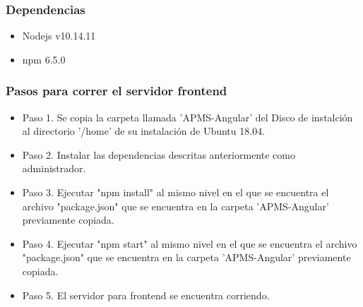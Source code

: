 \subsubsection{Dependencias}

\begin{itemize}
    \item Nodejs v10.14.11
    \item npm 6.5.0
\end{itemize}

\subsubsection{Pasos para correr el servidor frontend}

\begin{itemize}
    \item Paso 1. Se copia la carpeta llamada 'APMS-Angular' del Disco de instalci\'on al
    directorio '/home' de su instalaci\'on de Ubuntu 18.04.
    \item Paso 2. Instalar las dependencias descritas anteriormente como administrador.
    \item Paso 3. Ejecutar "npm install" al mismo nivel en el que se encuentra el archivo
    "package.json" que se encuentra en la carpeta 'APMS-Angular' previamente copiada.
    \item Paso 4. Ejecutar "npm start"  al mismo nivel en el que se encuentra el archivo
    "package.json" que se encuentra en la carpeta 'APMS-Angular' previamente copiada.
    \item Paso 5. El servidor para frontend se encuentra corriendo.
\end{itemize}